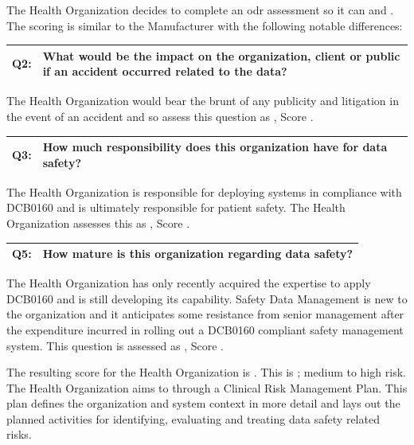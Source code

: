 The Health Organization decides to complete an \gls{odr} assessment
so it can  and . The scoring is similar to the Manufacturer with the following notable differences:

\begin{longtable*}[H]
  {|L{}|L{}|}
  \hline
  Q2: & What would be the impact on the organization, client or public if an accident occurred related to the data?\\
  \hline
\end{longtable*}

The Health Organization would bear the brunt of any publicity and litigation in the event of an accident and so assess this question as , Score .

\begin{longtable*}[H]
  {|L{}|L{}|}
  \hline
  Q3: & How much responsibility does this organization have for data safety?\\
  \hline
\end{longtable*}

The Health Organization is responsible for deploying systems in compliance with
DCB0160 \cite{citation:dcb0160clinical}
and is ultimately responsible for patient safety. The Health Organization assesses this as , Score .

\begin{longtable*}[H]
  {|L{}|L{}|}
  \hline
  Q5: & How mature is this organization regarding data safety?\\
  \hline
\end{longtable*}

The Health Organization has only recently acquired the expertise to apply
DCB0160
and is still developing its capability. Safety Data Management is new to the organization and it anticipates some resistance from senior management after the expenditure incurred in rolling out a
DCB0160
compliant safety management system. This question is assessed as , Score .

The resulting score for the Health Organization is . This is ; medium to high risk.
The Health Organization aims to  through a Clinical Risk Management Plan. This plan defines the organization and system context in more detail and lays out the planned activities for identifying, evaluating and treating data safety related risks.

